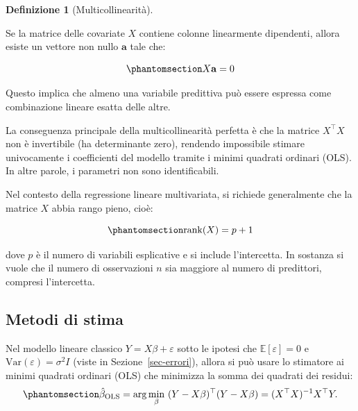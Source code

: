 \documentclass[
  italian,
  a4paper,
  a4paper,
  twoside,
  open=right,
  12pt]{scrbook}
\theoremstyle{definition}
\newtheorem{definition}{Definizione}[chapter]
\theoremstyle{remark}
\begin{document}
\begin{definition}[Multicollinearità]\protect\hypertarget{def-multicollinearita}{}\label{def-multicollinearita}

Se la matrice delle covariate \(X\) contiene colonne linearmente
dipendenti, allora esiste un vettore non nullo \(\mathbf{a}\) tale che:

\begin{equation}\phantomsection\label{eq-vettore_nullo}{
X \mathbf{a} = 0
}\end{equation}

Questo implica che almeno una variabile predittiva può essere espressa
come combinazione lineare esatta delle altre.

\end{definition}

La conseguenza principale della multicollinearità perfetta è che la
matrice \(X^\top X\) non è invertibile (ha determinante zero), rendendo
impossibile stimare univocamente i coefficienti del modello tramite i
minimi quadrati ordinari (OLS). In altre parole, i parametri non sono
identificabili.

Nel contesto della regressione lineare multivariata, si richiede
generalmente che la matrice \(X\) abbia rango pieno, cioè:

\begin{equation}\phantomsection\label{eq-rango_pieno}{
\operatorname{rank}(X) = p + 1
}\end{equation}

dove \(p\) è il numero di variabili esplicative e si include
l'intercetta. In sostanza si vuole che il numero di osservazioni \(n\)
sia maggiore al numero di predittori, compresi l'intercetta.

\subsection{Metodi di stima}\label{sec-metodi_stima}

Nel modello lineare classico \(Y = X\beta + \varepsilon\) sotto le
ipotesi che \(\mathbb{E}[\varepsilon]=0\) e
\(\mathrm{Var}(\varepsilon)=\sigma^2 I\) (viste in
Sezione~\ref{sec-errori}), allora si può usare lo stimatore ai minimi
quadrati ordinari (OLS) che minimizza la somma dei quadrati dei residui:
\begin{equation}\phantomsection\label{eq-stima_ols}{
\hat\beta_{\mathrm{OLS}}  =  \arg\min_{\beta}\ (Y - X\beta)^\top (Y - X\beta)
 =  (X^\top X)^{-1} X^\top Y.
}\end{equation}
\end{document}

